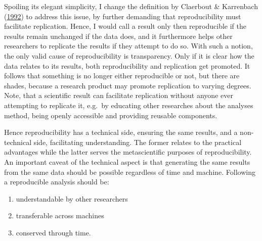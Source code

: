 \documentclass[12pt,a4paper,]{article}
\providecommand{\tightlist}{%
  \setlength{\itemsep}{0pt}\setlength{\parskip}{0pt}}
\begin{document}
Spoiling its elegant simplicity, I change the definition by Claerbout \& Karrenbach (\protect\hyperlink{ref-claerboutElectronicDocumentsGive1992}{1992}) to address this issue, by further demanding that reproducibility must facilitate replication.
Hence, I would call a result only then reproducible if the results remain unchanged if the data does, and it furthermore helps other researchers to replicate the results if they attempt to do so.
With such a notion, the only valid cause of reproducibility is transparency.
Only if it is clear how the data relates to its results, both reproducibility and replication get promoted.
It follows that something is no longer either reproducible or not, but there are shades, because a research product may promote replication to varying degrees.
Note, that a scientific result can facilitate replication without anyone ever attempting to replicate it, e.g.~by educating other researches about the analyses method, being openly accessible and providing reusable components.

Hence reproducibility has a technical side, ensuring the same results, and a non-technical side, facilitating understanding.
The former relates to the practical advantages while the latter serves the metascientific purposes of reproducibility.
An important caveat of the technical aspect is that generating the same results from the same data should be possible regardless of time and machine.
Following a reproducible analysis should be:

\begin{enumerate}
\def\labelenumi{\arabic{enumi}.}
\tightlist
\item
  understandable by other researchers
\item
  transferable across machines
\item
  conserved through time.
\end{enumerate}
\end{document}
